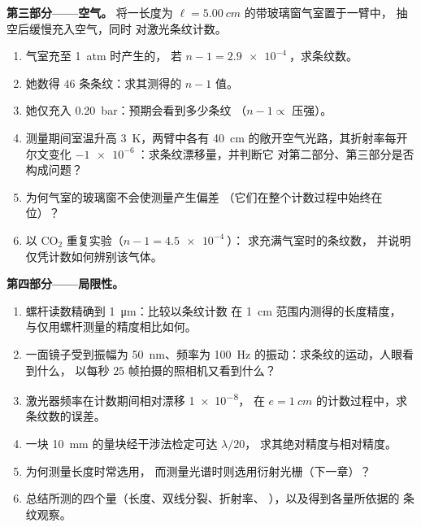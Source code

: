 \begin{problem}
\medskip
\noindent\textbf{第三部分——空气。}
将一长度为 $\ell = \qty{5.00}{cm}$ 的带玻璃窗气室置于一臂中，
抽空后缓慢充入空气，同时
对激光条纹计数。
\begin{enumerate}[resume]
  \item 气室充至 \qty{1}{atm} 时产生的，
        若 $n - 1 = \qty{2.9e-4}{}$，求条纹数。
  \item 她数得 $46$ 条条纹：求其测得的 $n - 1$ 值。
  \item 她仅充入 \qty{0.20}{bar}：预期会看到多少条纹
        （$n - 1 \propto$ 压强）。
  \item 测量期间室温升高 \qty{3}{K}，两臂中各有
        \qty{40}{cm} 的敞开空气光路，其折射率每开尔文变化
        $-\qty{1e-6}{}$：求条纹漂移量，并判断它
        对第二部分、第三部分是否构成问题？
  \item 为何气室的玻璃窗不会使测量产生偏差
        （它们在整个计数过程中始终在位）？
  \item 以 CO$_2$ 重复实验（$n - 1 = \qty{4.5e-4}{}$）：
        求充满气室时的条纹数，
        并说明仅凭计数如何辨别该气体。
\end{enumerate}

\medskip
\noindent\textbf{第四部分——局限性。}
\begin{enumerate}[resume]
  \item 螺杆读数精确到 \qty{1}{\micro m}：比较以条纹计数
        在 \qty{1}{cm} 范围内测得的长度精度，
        与仅用螺杆测量的精度相比如何。
  \item 一面镜子受到振幅为 \qty{50}{nm}、频率为 \qty{100}{Hz}
        的振动：求条纹的运动，人眼看到什么，
        以每秒 $25$ 帧拍摄的照相机又看到什么？
  \item 激光器频率在计数期间相对漂移 \qty{1e-8}{}，
        在 $e = \qty{1}{cm}$ 的计数过程中，求条纹数的误差。
  \item 一块 \qty{10}{mm} 的量块经干涉法检定可达 $\lambda/20$，
        求其绝对精度与相对精度。
  \item 为何测量长度时常选用，
        而测量光谱时则选用衍射光栅（下一章）？
  \item 总结所测的四个量（长度、双线分裂、折射率、
        ），以及得到各量所依据的
        条纹观察。
\end{enumerate}
\end{problem}
